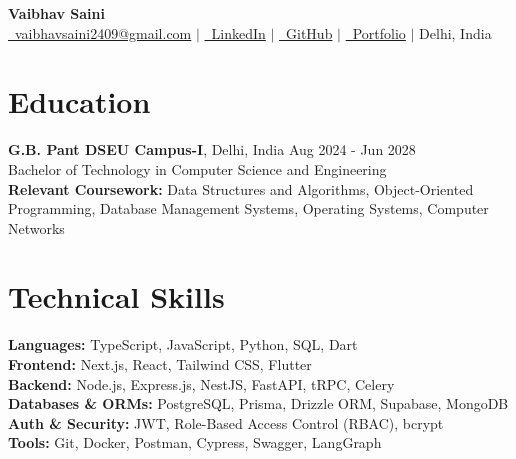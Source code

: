 \documentclass[11pt,letterpaper]{article}
\begin{document}
\begin{center}
  {\Huge \textbf{Vaibhav Saini}}\\[4pt]
  \href{mailto:vaibhavsaini2409@gmail.com}{\faEnvelope\ vaibhavsaini2409@gmail.com} $|$
  \href{https://www.linkedin.com/in/vaibhavsaini2/}{\faLinkedin\ LinkedIn} $|$
  \href{https://github.com/vbhvx}{\faGithub\ GitHub} $|$
  \href{https://vaibhavdev.online/}{\faGlobe\ Portfolio} $|$
  Delhi, India
\end{center}
\vspace{-8pt}

\section{Education}
\textbf{G.B. Pant DSEU Campus-I}, Delhi, India \hfill Aug 2024 - Jun 2028\\
Bachelor of Technology in Computer Science and Engineering\\
\textbf{Relevant Coursework:} Data Structures and Algorithms, Object-Oriented Programming, Database Management Systems, Operating Systems, Computer Networks

\section{Technical Skills}
\textbf{Languages:} TypeScript, JavaScript, Python, SQL, Dart\\
\textbf{Frontend:} Next.js, React, Tailwind CSS, Flutter\\
\textbf{Backend:} Node.js, Express.js, NestJS, FastAPI, tRPC, Celery\\
\textbf{Databases \& ORMs:} PostgreSQL, Prisma, Drizzle ORM, Supabase, MongoDB\\
\textbf{Auth \& Security:} JWT, Role-Based Access Control (RBAC), bcrypt\\
\textbf{Tools:} Git, Docker, Postman, Cypress, Swagger, LangGraph
\end{document}
